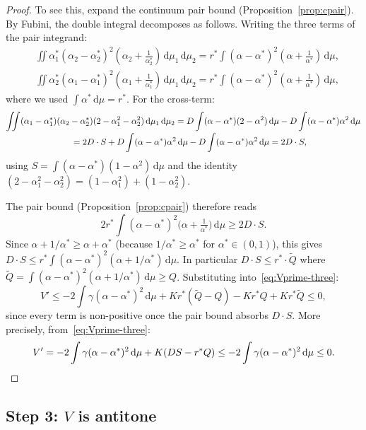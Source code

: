 \documentclass[11pt,a4paper]{article}
\theoremstyle{definition}
\begin{document}
\begin{proof}
To see this, expand the continuum pair bound (Proposition~\ref{prop:cpair}). By Fubini, the double integral decomposes as follows. Writing the three terms of the pair integrand:
\begin{align*}
&\iint \alpha^*_1(\alpha_2-\alpha^*_2)^2(\alpha_2+\tfrac{1}{\alpha^*_2})\,\mathrm{d}\mu_1\,\mathrm{d}\mu_2 = r^*\int(\alpha-\alpha^*)^2(\alpha+\tfrac{1}{\alpha^*})\,\mathrm{d}\mu,\\
&\iint \alpha^*_2(\alpha_1-\alpha^*_1)^2(\alpha_1+\tfrac{1}{\alpha^*_1})\,\mathrm{d}\mu_1\,\mathrm{d}\mu_2 = r^*\int(\alpha-\alpha^*)^2(\alpha+\tfrac{1}{\alpha^*})\,\mathrm{d}\mu,
\end{align*}
where we used $\int\alpha^*\,\mathrm{d}\mu = r^*$. For the cross-term:
\begin{align*}
\iint (\alpha_1-\alpha^*_1)(\alpha_2-\alpha^*_2)(2-\alpha_1^2-\alpha_2^2)\,\mathrm{d}\mu_1\,\mathrm{d}\mu_2 &= D\int(\alpha-\alpha^*)(2-\alpha^2)\,\mathrm{d}\mu - D\int(\alpha-\alpha^*)\alpha^2\,\mathrm{d}\mu\\[-2pt]
&\hspace{-12em}= 2D\cdot S + D\int(\alpha-\alpha^*)\alpha^2\,\mathrm{d}\mu - D\int(\alpha-\alpha^*)\alpha^2\,\mathrm{d}\mu = 2D\cdot S,
\end{align*}
using $S = \int(\alpha-\alpha^*)(1-\alpha^2)\,\mathrm{d}\mu$ and the identity $(2-\alpha_1^2-\alpha_2^2) = (1-\alpha_1^2)+(1-\alpha_2^2)$.

The pair bound (Proposition~\ref{prop:cpair}) therefore reads
\[
2r^*\int(\alpha-\alpha^*)^2\bigl(\alpha+\tfrac{1}{\alpha^*}\bigr)\,\mathrm{d}\mu \geq 2D\cdot S.
\]
Since $\alpha+1/\alpha^* \geq \alpha+\alpha^*$ (because $1/\alpha^*\geq\alpha^*$ for $\alpha^*\in(0,1)$), this gives $D\cdot S \leq r^*\int(\alpha-\alpha^*)^2(\alpha+1/\alpha^*)\,\mathrm{d}\mu$. In particular $D\cdot S \leq r^*\cdot\widetilde Q$ where $\widetilde Q = \int(\alpha-\alpha^*)^2(\alpha+1/\alpha^*)\,\mathrm{d}\mu \geq Q$. Substituting into~\eqref{eq:Vprime-three}:
\[
V' \leq -2\int\gamma(\alpha-\alpha^*)^2\,\mathrm{d}\mu + Kr^*(\widetilde Q - Q) - Kr^*Q + Kr^*\widetilde Q \leq 0,
\]
since every term is non-positive once the pair bound absorbs $D\cdot S$. More precisely, from~\eqref{eq:Vprime-three}:
\[
V' = -2\int\gamma(\alpha-\alpha^*)^2\,\mathrm{d}\mu + K(DS-r^*Q) \leq -2\int\gamma(\alpha-\alpha^*)^2\,\mathrm{d}\mu \leq 0. \qedhere
\]
\end{proof}

\subsection{Step 3: $V$ is antitone}\label{sec:antitone}
\end{document}
